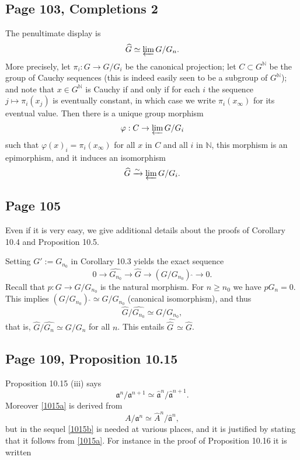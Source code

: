 \documentclass[parskip=half,fontsize=12pt]{scrartcl}%
\newcommand{\mf}{\mathfrak}
\begin{document}
\subsection{Page 103, Completions 2}%

The penultimate display is 
$$
\widehat G\simeq\varprojlim G/G_n.
$$ 
More precisely, let $\pi_i:G\to G/G_i$ be the canonical projection; let $C\subset G^{\mathbb N}$ be the group of Cauchy sequences (this is indeed easily seen to be a subgroup of $G^{\mathbb N}$); and note that $x\in G^{\mathbb N}$ is Cauchy if and only if for each $i$ the sequence $j\mapsto\pi_i(x_j)$ is eventually constant, in which case we write $\pi_i(x_\infty)$ for its eventual value. Then there is a unique group morphism 
$$
\varphi:C\to\varprojlim G/G_i
$$ 
such that $\varphi(x)_i=\pi_i(x_\infty)$ for all $x$ in $C$ and all $i$ in $\mathbb N$, this morphism is an epimorphism, and it induces an isomorphism 
$$
\widehat G\xrightarrow\sim\varprojlim G/G_i.
$$ %

\subsection{Page 105}%

Even if it is very easy, we give additional details about the proofs of Corollary 10.4 and Proposition 10.5. 

Setting $G':=G_{n_0}$ in Corollary 10.3 yields the exact sequence
$$
0\to\widehat{G_{n_0}}\to\widehat G\to(G/G_{n_0})\ \widehat{}\to0.
$$ 
Recall that $p:G\to G/G_{n_0}$ is the natural morphism. For $n\ge n_0$ we have $pG_n=0$. This implies $(G/G_{n_0})\ \widehat{}\simeq G/G_{n_0}$ (canonical isomorphism), and thus 
$$
\widehat G/\widehat{G_{n_0}}\simeq G/G_{n_0},
$$ 
that is, $\widehat G/\widehat{G_n}\simeq G/G_n$ for all $n$. This entails $\widehat{\widehat G\,}\simeq\widehat G$.

\subsection{Page 109, Proposition 10.15}%

Proposition 10.15 (iii) says 
\begin{equation}\label{1015a}
\mf a^n/\mf a^{n+1}\simeq\hat{\mf a}^n/\hat{\mf a}^{n+1}.
\end{equation}
Moreover \eqref{1015a} is derived from 
\begin{equation}\label{1015b}
A/\mf a^n\simeq\hat A^n/\hat{\mf a}^n,
\end{equation} 
but in the sequel \eqref{1015b} is needed at various places, and it is justified by stating that it follows from \eqref{1015a}. For instance in the proof of Proposition 10.16 it is written
\end{document}
